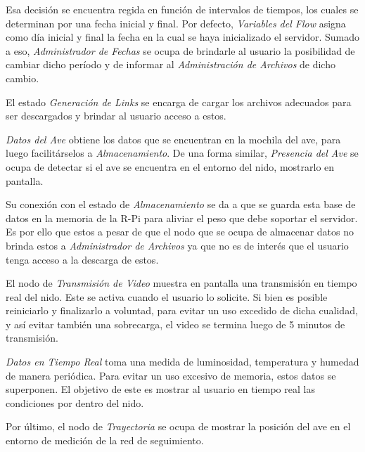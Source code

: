 Esa decisión se encuentra regida en función de intervalos de tiempos, los cuales se determinan por una fecha inicial y final. Por defecto, \textit{Variables del Flow} asigna como día inicial y final la fecha en la cual se haya inicializado el servidor. Sumado a eso, \textit{Administrador de Fechas} se ocupa de brindarle al usuario la posibilidad de cambiar dicho período y de informar al \textit{Administración de Archivos} de dicho cambio.

El estado \textit{Generación de Links} se encarga de cargar los archivos adecuados para ser descargados y brindar al usuario acceso a estos.

\textit{Datos del Ave} obtiene los datos que se encuentran en la mochila del ave, para luego facilitárselos a \textit{Almacenamiento}. De una forma similar, \textit{Presencia del Ave} se ocupa de detectar si el ave se encuentra en el entorno del nido, mostrarlo en pantalla.

Su conexión con el estado de \textit{Almacenamiento} se da a que se guarda esta base de datos en la memoria de la R-Pi para aliviar el peso que debe soportar el servidor. Es por ello que estos a pesar de que el nodo que se ocupa de almacenar datos no brinda estos a \textit{Administrador de Archivos} ya que no es de interés que el usuario tenga acceso a la descarga de estos.

El nodo de \textit{Transmisión de Video} muestra en pantalla una transmisión en tiempo real del nido. Este se activa cuando el usuario lo solicite. Si bien es posible reiniciarlo y finalizarlo a voluntad, para evitar un uso excedido de dicha cualidad, y así evitar también una sobrecarga, el video se termina luego de 5 minutos de transmisión.

\textit{Datos en Tiempo Real} toma una medida de luminosidad, temperatura y humedad de manera periódica. Para evitar un uso excesivo de memoria, estos datos se superponen. El objetivo de este es mostrar al usuario en tiempo real las condiciones por dentro del nido.

Por último, el nodo de \textit{Trayectoria} se ocupa de mostrar la posición del ave en el entorno de medición de la red de seguimiento.